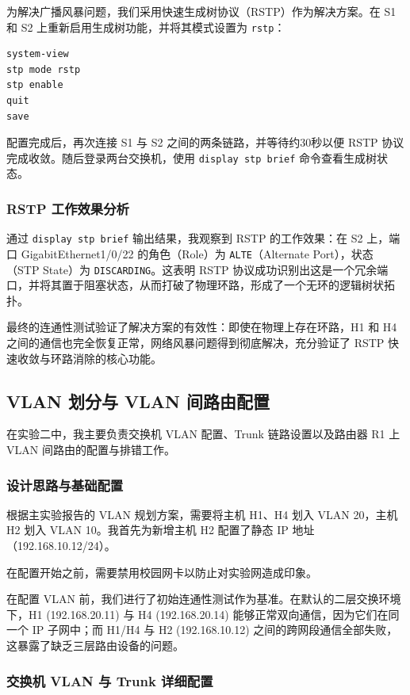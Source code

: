 \documentclass[a4paper]{article}
\begin{document}
为解决广播风暴问题，我们采用快速生成树协议（RSTP）作为解决方案。在 S1 和 S2 上重新启用生成树功能，并将其模式设置为 \texttt{rstp}：

\begin{lstlisting}
system-view
stp mode rstp
stp enable
quit
save
\end{lstlisting}

配置完成后，再次连接 S1 与 S2 之间的两条链路，并等待约30秒以便 RSTP 协议完成收敛。随后登录两台交换机，使用 \texttt{display stp brief} 命令查看生成树状态。

\subsubsection{RSTP 工作效果分析}

通过 \texttt{display stp brief} 输出结果，我观察到 RSTP 的工作效果：在 S2 上，端口 GigabitEthernet1/0/22 的角色（Role）为 \texttt{ALTE}（Alternate Port），状态（STP State）为 \texttt{DISCARDING}。这表明 RSTP 协议成功识别出这是一个冗余端口，并将其置于阻塞状态，从而打破了物理环路，形成了一个无环的逻辑树状拓扑。

最终的连通性测试验证了解决方案的有效性：即使在物理上存在环路，H1 和 H4 之间的通信也完全恢复正常，网络风暴问题得到彻底解决，充分验证了 RSTP 快速收敛与环路消除的核心功能。

\subsection{VLAN 划分与 VLAN 间路由配置}

在实验二中，我主要负责交换机 VLAN 配置、Trunk 链路设置以及路由器 R1 上 VLAN 间路由的配置与排错工作。

\subsubsection{设计思路与基础配置}

根据主实验报告的 VLAN 规划方案，需要将主机 H1、H4 划入 VLAN 20，主机 H2 划入 VLAN 10。我首先为新增主机 H2 配置了静态 IP 地址（192.168.10.12/24）。

在配置开始之前，需要禁用校园网卡以防止对实验网造成印象。

在配置 VLAN 前，我们进行了初始连通性测试作为基准。在默认的二层交换环境下，H1 (192.168.20.11) 与 H4 (192.168.20.14) 能够正常双向通信，因为它们在同一个 IP 子网中；而 H1/H4 与 H2 (192.168.10.12) 之间的跨网段通信全部失败，这暴露了缺乏三层路由设备的问题。

\subsubsection{交换机 VLAN 与 Trunk 详细配置}
\end{document}
